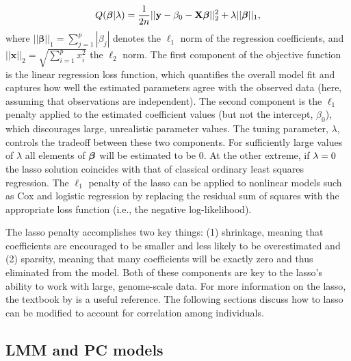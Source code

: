 \begin{equation}
    Q(\boldsymbol{\beta}{} | \lambda) = \frac{1}{2n}|| \mathbf{y} -  \beta_0 - \mathbf{X} \boldsymbol{\beta}{} ||_2^2 + \lambda ||\boldsymbol{\beta}{}||_1,
\end{equation}
where $|| \boldsymbol{\beta} ||_1 = \sum_{j=1}^p |\beta_j|$ denotes the $\ell_1$ norm of the regression coefficients, and $||\mathbf{x}||_2 = \sqrt{\sum_{i=1}^p x_i^2}$ the $\ell_2$ norm. The first component of the objective function is the linear regression loss function, which quantifies the overall model fit and captures how well the estimated parameters agree with the observed data (here, assuming that observations are independent). The second component is the $\ell_1$ penalty applied to the estimated coefficient values (but not the intercept, $\beta_0$), which discourages large, unrealistic parameter values. The tuning parameter, $\lambda$, controls the tradeoff between these two components. For sufficiently large values of $\lambda$ all elements of $\boldsymbol{\beta}{}$ will be estimated to be 0. At the other extreme, if $\lambda = 0$ the lasso solution coincides with that of classical ordinary least squares regression. The $\ell_1$ penalty of the lasso can be applied to nonlinear models such as Cox and logistic regression \citep{tibshirani1997lasso, shevade2003simple} by replacing the residual sum of squares with the appropriate loss function (i.e., the negative log-likelihood).

The lasso penalty accomplishes two key things: (1) shrinkage, meaning that coefficients are encouraged to be smaller and less likely to be overestimated and (2) sparsity, meaning that many coefficients will be exactly zero and thus eliminated from the model. Both of these components are key to the lasso's ability to work with large, genome-scale data.  For more information on the lasso, the textbook by \citet{Hastie2009} is a useful reference.  The following sections discuss how to lasso can be modified to account for correlation among individuals.

\subsection{LMM and PC models}
\label{sec:lmm-and-pc}

